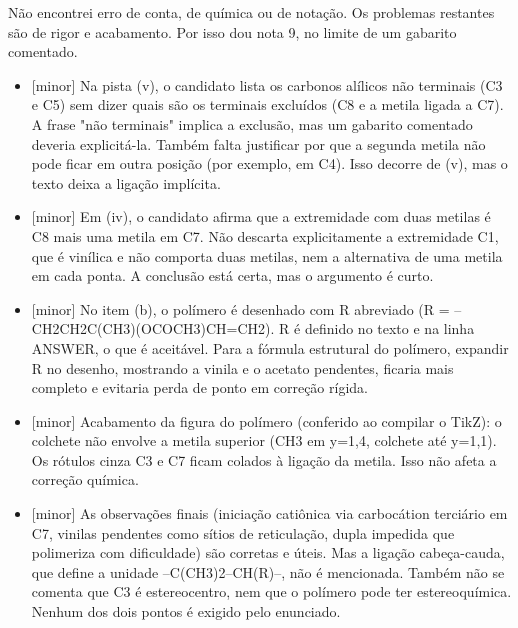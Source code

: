 \documentclass{article}%
\begin{document}
\newline%
Não encontrei erro de conta, de química ou de notação. Os problemas restantes são de rigor e acabamento. Por isso dou nota 9, no limite de um gabarito comentado.%
\begin{itemize}%
\item%
{[}minor{]} Na pista (v), o candidato lista os carbonos alílicos não terminais (C3 e C5) sem dizer quais são os terminais excluídos (C8 e a metila ligada a C7). A frase "não terminais" implica a exclusão, mas um gabarito comentado deveria explicitá{-}la. Também falta justificar por que a segunda metila não pode ficar em outra posição (por exemplo, em C4). Isso decorre de (v), mas o texto deixa a ligação implícita.%
\item%
{[}minor{]} Em (iv), o candidato afirma que a extremidade com duas metilas é C8 mais uma metila em C7. Não descarta explicitamente a extremidade C1, que é vinílica e não comporta duas metilas, nem a alternativa de uma metila em cada ponta. A conclusão está certa, mas o argumento é curto.%
\item%
{[}minor{]} No item (b), o polímero é desenhado com R abreviado (R = --CH2CH2C(CH3)(OCOCH3)CH=CH2). R é definido no texto e na linha ANSWER, o que é aceitável. Para a fórmula estrutural do polímero, expandir R no desenho, mostrando a vinila e o acetato pendentes, ficaria mais completo e evitaria perda de ponto em correção rígida.%
\item%
{[}minor{]} Acabamento da figura do polímero (conferido ao compilar o TikZ): o colchete não envolve a metila superior (CH3 em y=1,4, colchete até y=1,1). Os rótulos cinza C3 e C7 ficam colados à ligação da metila. Isso não afeta a correção química.%
\item%
{[}minor{]} As observações finais (iniciação catiônica via carbocátion terciário em C7, vinilas pendentes como sítios de reticulação, dupla impedida que polimeriza com dificuldade) são corretas e úteis. Mas a ligação cabeça{-}cauda, que define a unidade --C(CH3)2--CH(R)--, não é mencionada. Também não se comenta que C3 é estereocentro, nem que o polímero pode ter estereoquímica. Nenhum dos dois pontos é exigido pelo enunciado.%
\end{itemize}%
\end{document}
